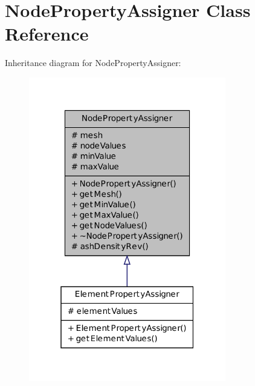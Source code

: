 \hypertarget{class_node_property_assigner}{
\section{NodePropertyAssigner Class Reference}
\label{class_node_property_assigner}
}


Inheritance diagram for NodePropertyAssigner:
\nopagebreak
\begin{figure}[H]
\begin{center}
\leavevmode
\includegraphics[width=244pt]{class_node_property_assigner__inherit__graph}
\end{center}
\end{figure}
